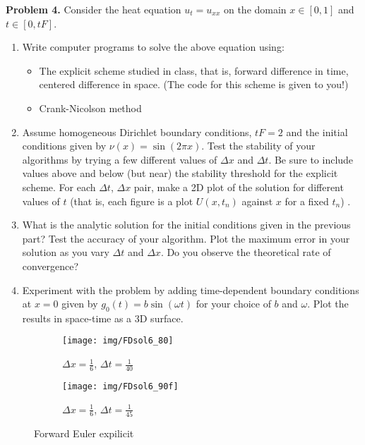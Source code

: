 \documentclass{article}
\begin{document}
\begin{flushleft}
\par \textbf{Problem 4.}
Consider the heat equation $u_t = u_{xx}$ on the domain $x \in [0, 1]$ and
$t \in [0, tF ]$.

\begin{enumerate}[label=(\alph*)]
\item Write computer programs to solve the above equation using:
\begin{itemize}
\item The explicit scheme studied in class, that is, forward difference
in time, centered difference in space. (The code for this
scheme is given to you!)
\item Crank-Nicolson method
\end{itemize}
\item Assume homogeneous Dirichlet boundary conditions, $tF = 2$ and
the initial conditions given by $\nu(x) = \sin(2 \pi x)$. Test the stability
of your algorithms by trying a few different values of $\Delta x$ and $\Delta t$.
Be sure to include values above and below (but near) the stability
threshold for the explicit scheme. For each $\Delta t$, $\Delta x$ pair, make
a 2D plot of the solution for different values of $t$ (that is, each
figure is a plot $U(x, t_n)$ against $x$ for a fixed $t_n$) .
\item What is the analytic solution for the initial conditions given in
the previous part? Test the accuracy of your algorithm. Plot the
maximum error in your solution as you vary $\Delta t$ and $\Delta x$. Do you
observe the theoretical rate of convergence?
\item Experiment with the problem by adding time-dependent boundary
conditions at $x = 0$ given by $g_0(t) = b \sin(\omega t)$ for your choice
of $b$ and $\omega$. Plot the results in space-time as a 3D surface.
\end{enumerate}


\begin{figure}
    \centering
    \begin{subfigure}[t]{0.5\textwidth}
        \texttt{[image: img/FDsol6\_80]}
        \caption{$\Delta x = \frac{1}{6}$, $\Delta t = \frac{1}{40}$}
        \label{fig:gull}
    \end{subfigure}
    \begin{subfigure}[t]{0.4\textwidth}
        \texttt{[image: img/FDsol6\_90f]}
        \caption{$\Delta x = \frac{1}{6}$, $\Delta t = \frac{1}{45}$  }
        \label{fig:tiger}
    \end{subfigure}
    \caption{Forward Euler expilicit}\label{fig:animals}
\end{figure}


\end{flushleft}
\end{document}
